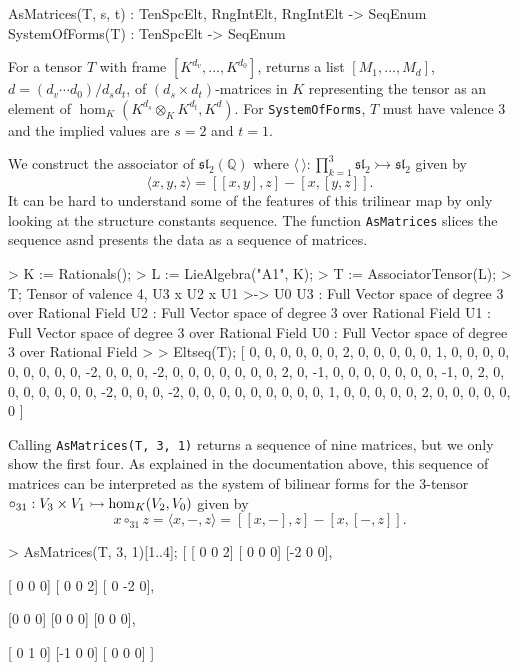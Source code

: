 \begin{intrinsics}
AsMatrices(T, s, t) : TenSpcElt, RngIntElt, RngIntElt -> SeqEnum
SystemOfForms(T) : TenSpcElt -> SeqEnum
\end{intrinsics}

For a tensor $T$ with frame $[K^{d_v},\dots,K^{d_0}]$, 
returns a list $[M_1,\dots,M_d]$, $d=(d_v\cdots d_0)/d_s d_t$, 
of $(d_s\times d_t)$-matrices in $K$ representing the tensor
as an element of $\hom_K(K^{d_s}\otimes_K K^{d_t},K^d)$.
For {\tt SystemOfForms}, $T$ must have valence $3$ and the implied values
are $s=2$ and $t=1$.


\begin{example}[TrilinearAsMats]

We construct the associator of $\mathfrak{sl}_2(\mathbb{Q})$ where $\langle \, \rangle : \prod_{k=1}^3\mathfrak{sl}_2\rightarrowtail \mathfrak{sl}_2$ given by
\[ \langle x,y,z \rangle = [[x,y],z] - [x,[y,z]]. \]
It can be hard to understand some of the features of this trilinear map by only looking at the structure constants sequence. 
The function {\tt AsMatrices} slices the sequence asnd presents the data as a sequence of matrices.
\begin{code}
> K := Rationals();
> L := LieAlgebra("A1", K);
> T := AssociatorTensor(L);
> T;
Tensor of valence 4, U3 x U2 x U1 >-> U0
U3 : Full Vector space of degree 3 over Rational Field
U2 : Full Vector space of degree 3 over Rational Field
U1 : Full Vector space of degree 3 over Rational Field
U0 : Full Vector space of degree 3 over Rational Field
>
> Eltseq(T);
[ 0, 0, 0, 0, 0, 0, 2, 0, 0, 0, 0, 0, 1, 0, 0, 0, 0, 0, 0, 0, 0, 0, -2,
0, 0, 0, -2, 0, 0, 0, 0, 0, 0, 0, 2, 0, -1, 0, 0, 0, 0, 0, 0, 0, -1, 0,
2, 0, 0, 0, 0, 0, 0, 0, -2, 0, 0, 0, -2, 0, 0, 0, 0, 0, 0, 0, 0, 0, 1, 
0, 0, 0, 0, 0, 2, 0, 0, 0, 0, 0, 0 ]
\end{code}

Calling {\tt AsMatrices(T, 3, 1)} returns a sequence of nine matrices, but we only show the first four.
As explained in the documentation above, this sequence of matrices can be interpreted as the system of bilinear forms for the 3-tensor $\circ_{31} : V_3 \times V_1 \rightarrowtail \operatorname{hom}_K(V_2,V_0)$ given by
\[ x\circ_{31} z = \langle x, -,z \rangle = [[x,-],z] - [x,[-,z]].\]

\begin{code}
> AsMatrices(T, 3, 1)[1..4];
[
    [ 0  0  2]
    [ 0  0  0]
    [-2  0  0],

    [ 0  0  0]
    [ 0  0  2]
    [ 0 -2  0],

    [0 0 0]
    [0 0 0]
    [0 0 0],

    [ 0  1  0]
    [-1  0  0]
    [ 0  0  0]
]
\end{code}
\end{example}



